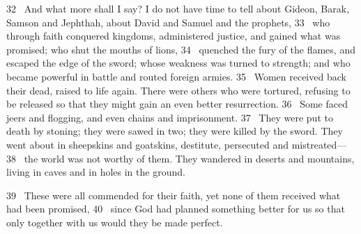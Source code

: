 \par
32 
And what more shall I say? I do not have time to tell about Gideon,
Barak,
Samson
and Jephthah,
about David
and Samuel
and the prophets,
33 
who through faith conquered kingdoms,
administered justice, and gained what was promised; who shut the mouths of lions,
34 
quenched the fury of the flames,
and escaped the edge of the sword;
whose weakness was turned to strength;
and who became powerful in battle and routed foreign armies.
35 
Women received back their dead, raised to life again.
There were others who were tortured, refusing to be released so that they might gain an even better resurrection.
36 
Some faced jeers and flogging,
and even chains and imprisonment.
37 
They were put to death by stoning;
they were sawed in two; they were killed by the sword.
They went about in sheepskins and goatskins,
destitute, persecuted and mistreated—
38 
the world was not worthy of them. They wandered in deserts and mountains, living in caves
and in holes in the ground.
\par
39 
These were all commended
for their faith, yet none of them received what had been promised,
40 
since God had planned something better for us so that only together with us
would they be made perfect.


\bye

